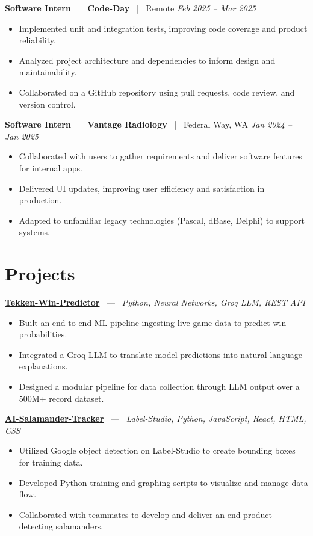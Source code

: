 \documentclass[10pt, letterpaper]{article}
\newcommand{\jobhead}[4]{%
  \vspace{5pt}%
  {\bfseries\color{dark}#1}%
  ~{\color{light}|}~%
  {\bfseries\color{navy}#2}%
  ~{\color{light}|}~%
  {\color{light}#3}%
  \hfill{\color{light}\small\textit{#4}}\\[-2pt]%
}
\newcommand{\projhead}[3]{%
  \vspace{5pt}%
  {\bfseries\color{dark}\href{#2}{#1}}%
  ~{\color{light}---}~%
  {\color{light}\small\textit{#3}}\\[-2pt]%
}
\begin{document}
\jobhead{Software Intern}{Code-Day}{Remote}{Feb 2025 – Mar 2025}
\begin{itemize}
  \item Implemented unit and integration tests, improving code coverage and product reliability.
  \item Analyzed project architecture and dependencies to inform design and maintainability.
  \item Collaborated on a GitHub repository using pull requests, code review, and version control.
\end{itemize}

\jobhead{Software Intern}{Vantage Radiology}{Federal Way, WA}{Jan 2024 – Jan 2025}
\begin{itemize}
  \item Collaborated with users to gather requirements and deliver software features for internal apps.
  \item Delivered UI updates, improving user efficiency and satisfaction in production.
  \item Adapted to unfamiliar legacy technologies (Pascal, dBase, Delphi) to support systems.
\end{itemize}

\section{Projects}

\projhead{Tekken-Win-Predictor}{}{Python, Neural Networks, Groq LLM, REST API}
\begin{itemize}
  \item Built an end-to-end ML pipeline ingesting live game data to predict win probabilities.
  \item Integrated a Groq LLM to translate model predictions into natural language explanations.
  \item Designed a modular pipeline for data collection through LLM output over a 500M+ record dataset.
\end{itemize}

\projhead{AI-Salamander-Tracker}{https://github.com/xavierb117/Salamander-Tracker-YOLO}{Label-Studio, Python, JavaScript, React, HTML, CSS}
\begin{itemize}
  \item Utilized Google object detection on Label-Studio to create bounding boxes for training data.
  \item Developed Python training and graphing scripts to visualize and manage data flow.
  \item Collaborated with teammates to develop and deliver an end product detecting salamanders.
\end{itemize}
\end{document}
